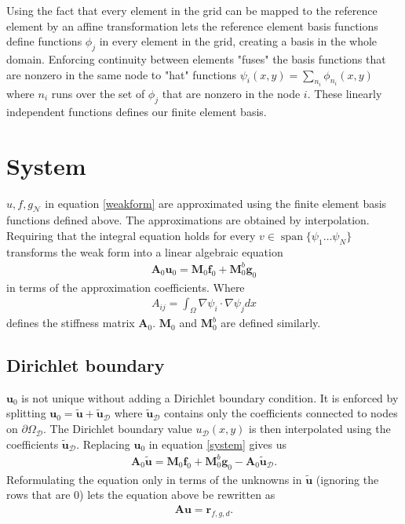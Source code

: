 \documentclass[12pt,a4paper]{report}
\DeclareMathOperator{\spn}{span}
\begin{document}
Using the fact that every element in the grid can be mapped to the reference element by an affine transformation lets the reference element basis functions define functions $\phi_j$ in every element in the grid, creating a basis in the whole domain. Enforcing continuity between elements "fuses" the basis functions that are nonzero in the same node to "hat" functions $\psi_{i}(x, y) = \sum_{n_i} \phi_{n_i}(x, y)$ where $n_i$ runs over the set of $\phi_j$ that are nonzero in the node $i$. These linearly independent functions defines our finite element basis.

\section*{System}

$u,f,g_\mathcal{N}$ in equation \eqref{weakform} are approximated using the finite element basis functions defined above. The approximations are obtained by interpolation. Requiring that the integral equation holds for every $v \in \spn\{\psi_1\ldots\psi_N\}$ transforms the weak form into a linear algebraic equation
\begin{align}
    \label{system}
    \mathbf{A}_0\mathbf{u}_0 = \mathbf{M}_0\mathbf{f}_0 + \mathbf{M}_0^b \mathbf{g}_0
\end{align}
in terms of the approximation coefficients. Where
\begin{align}
    A_{ij} = \int_{\Omega} \nabla \psi_i \cdot \nabla \psi_j dx
\end{align}
defines the stiffness matrix $\mathbf{A}_0$. $\mathbf{M}_0$ and $\mathbf{M}_0^b$ are defined similarly.\\

\subsection*{Dirichlet boundary}
$\mathbf{u}_0$ is not unique without adding a Dirichlet boundary condition. It is enforced by splitting $\mathbf{u}_0= \tilde{\mathbf{u}} + \tilde{\mathbf{u}}_\mathcal{D}$ where $\tilde{\mathbf{u}}_\mathcal{D}$ contains only the coefficients connected to nodes on $\partial\Omega_\mathcal{D}$. The Dirichlet boundary value $u_\mathcal{D}(x, y)$ is then interpolated using the coefficients $\tilde{\mathbf{u}}_\mathcal{D}$. Replacing $\mathbf{u}_0$ in equation \eqref{system} gives us
\begin{align}
\label{system_full}
\mathbf{A}_0 \tilde{\mathbf{u}} = \mathbf{M}_0\mathbf{f}_0 + \mathbf{M}_0^b \mathbf{g}_0 - \mathbf{A}_0 \tilde{\mathbf{u}}_\mathcal{D}.
\end{align}
Reformulating the equation only in terms of the unknowns in $\tilde{\mathbf{u}}$ (ignoring the rows that are 0) lets the equation above be rewritten as 
\begin{align}
\label{system_fin}
\mathbf{A} \mathbf{u} = \mathbf{r}_{f,g,d}.
\end{align}
\end{document}
